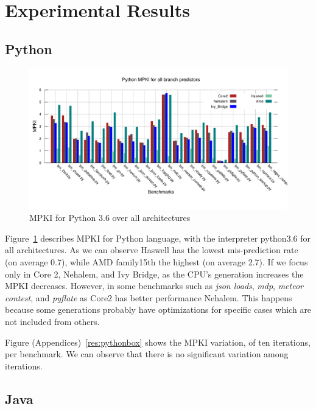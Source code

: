 \documentclass[parskip=full, paper=a4, fontsize=12pt]{scrartcl}
\numberwithin{equation}{section}
\numberwithin{figure}{section}
\numberwithin{table}{section}
\begin{document}
\section{Experimental Results}
\subsection{Python}
\begin{figure}[t]
	\centering
	\includegraphics[width=1\textwidth]{figures/python_MPKI.pdf}
	\caption{MPKI for Python 3.6 over all architectures}
	\label{fig:pythonmpki}
\end{figure}
Figure~\ref{fig:pythonmpki} describes MPKI for Python language, with the interpreter python3.6 for all architectures. As we can observe Haswell has the lowest mis-prediction rate (on average 0.7), while AMD family15th the highest (on average 2.7). If we focus only in Core 2, Nehalem, and Ivy Bridge, as the CPU's generation increases the MPKI decreases. However, in some benchmarks such as \textit{json loads}, \textit{mdp}, \textit{meteor contest}, and \textit{pyflate} as Core2 has better performance Nehalem. This happens because some generations probably have optimizations for specific cases which are not included from others.  

Figure (Appendices)~\ref{res:pythonbox} shows the MPKI variation, of ten iterations, per benchmark. We can observe that there is no significant variation among iterations.

\subsection{Java}
\end{document}

